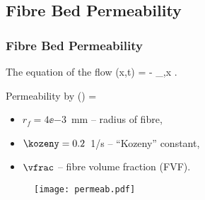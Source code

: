 \documentclass[compress]{beamer}%
\newenvironment{myalign}
{\align\color{\notcolor}}
{
  \nonumber
  \endalign
  \vspace{-1em}
}
\begin{document}
\subsection{Fibre Bed Permeability}

\begin{frame}
  \frametitle{Fibre Bed Permeability}
      The equation of the flow
      \begin{myalign}
        \flow(x,t) = - \press_{,x} .
      \end{myalign}
      
      Permeability by \citet{Dave1987b}
      \begin{myalign}
        \permeab(\vfrac) =   
      \end{myalign}
      \begin{itemize}
        \itemsep 0mm
      \item $r_f=4\ee{-3}$~mm -- radius of fibre,
      \item $\kozeny=0.2$~1/s -- ``Kozeny'' constant, 
      \item $\vfrac$ -- fibre volume fraction (FVF).
      \end{itemize}

      \begin{figure}
  \centering
  \texttt{[image: permeab.pdf]}
  \label{fig:permeab}
\end{figure}


  
\end{frame}
\end{document}

